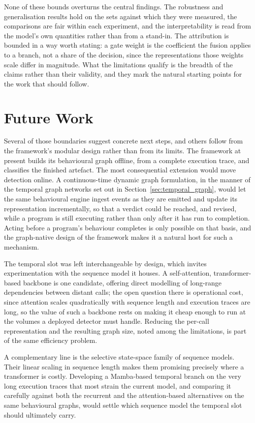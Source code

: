\documentclass[%
    BCOR=10mm,
    DIV=13,
    toc=bibliography,
    toc=listof,
    oneside,
    12pt,
]{scrbook}
\begin{document}
None of these bounds overturns the central findings. The robustness and
generalisation results hold on the sets against which they were measured, the
comparisons are fair within each experiment, and the interpretability is read from the
model's own quantities rather than from a stand-in. The attribution is bounded in a
way worth stating: a gate weight is the coefficient the fusion applies to a branch,
not a share of the decision, since the representations those weights scale differ in
magnitude. What the limitations qualify is the breadth of the claims rather than
their validity, and they mark the natural starting points for the work that should
follow.

\section{Future Work}
\label{sec:future_work}

Several of those boundaries suggest concrete next steps, and others follow from the
framework's modular design rather than from its limits. The framework at present
builds its behavioural graph offline, from a complete execution trace, and
classifies the finished artefact. The most consequential extension would move
detection online. A continuous-time dynamic graph formulation, in the manner of the
temporal graph networks set out in Section~\ref{sec:temporal_graph}, would let the
same behavioural engine ingest events as they are emitted and update its
representation incrementally, so that a verdict could be reached, and revised, while
a program is still executing rather than only after it has run to completion. Acting
before a program's behaviour completes is only possible on that basis, and the
graph-native design of the framework makes it a natural host for such a mechanism.

The temporal slot was left interchangeable by design, which invites
experimentation with the sequence model it houses. A
self-attention, transformer-based backbone is one candidate, offering direct
modelling of long-range dependencies between distant calls; the open question there
is operational cost, since attention scales quadratically with sequence length and
execution traces are long, so the value of such a backbone rests on making it cheap
enough to run at the volumes a deployed detector must handle. Reducing the per-call
representation and the resulting graph size, noted among the limitations, is part of
the same efficiency problem.

A complementary line is the selective state-space family of sequence models.
Their linear scaling in sequence length makes them
promising precisely where a transformer is costly. Developing a Mamba-based
temporal branch on the very long execution traces that most strain the current
model, and comparing it carefully against both the recurrent and the
attention-based alternatives on the same behavioural graphs, would settle which
sequence model the temporal slot should ultimately carry.
\end{document}
